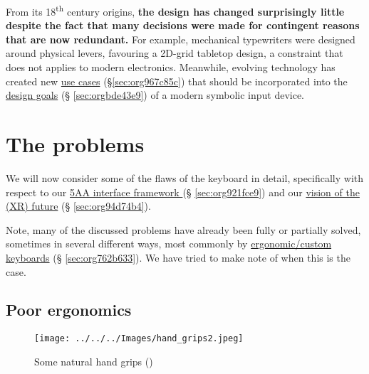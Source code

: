 \documentclass[logo,bsc,singlespacing,parskip]{infthesis}
\begin{document}
From its 18\textsuperscript{th} century origins, \textbf{the design has changed surprisingly little despite the fact that many decisions were made for contingent reasons that are now redundant.}
For example, mechanical typewriters were designed around physical levers, favouring a 2D-grid tabletop design, a constraint that does not applies to modern electronics.
Meanwhile, evolving technology has created new \hyperref[sec:org967c85c]{use cases} (\S \ref{sec:org967c85c}) that should be incorporated into the \hyperref[sec:orgbde43e9]{design goals} (§ \ref{sec:orgbde43e9}) of a modern symbolic input device.
\section{The problems}
\label{sec:orgc7d0130}
We will now consider some of the flaws of the keyboard in detail, specifically with respect to our  \hyperref[sec:org921fce9]{5AA interface framework } (§ \ref{sec:org921fce9}) and our \hyperref[sec:org94d74b4]{vision of the (XR) future} (§ \ref{sec:org94d74b4}).

Note, many of the discussed problems have already been fully or partially solved, sometimes in several different ways, most commonly by \hyperref[sec:org762b633]{ergonomic/custom keyboards} (§ \ref{sec:org762b633}).
We have tried to make note of when this is the case.
\subsection{Poor ergonomics}
\label{sec:org28b7ed2}
\begin{figure}[h]
\centering
\texttt{[image: ../../../Images/hand\_grips2.jpeg]}
\caption{\label{fig:hand_grips}Some natural hand grips (\autocite{victorBriefRantFuture})}
\end{figure}
\end{document}

